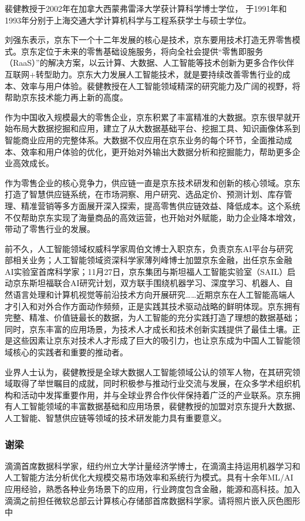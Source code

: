 \documentclass[letterpaper,10pt,english]{sphinxmanual}
\begin{document}
裴健教授于2002年在加拿大西蒙弗雷泽大学获计算科学博士学位，
于1991年和1993年分别于上海交通大学计算机科学与工程系获学士与硕士学位。

刘强东表示，京东下一个十二年发展的核心是技术，京东要用技术打造无界零售模式。京东定位于未来的零售基础设施服务，将向全社会提供“零售即服务（RaaS）”的解决方案，以云计算、大数据、人工智能等技术创新为更多合作伙伴互联网+转型助力。京东大力发展人工智能技术，就是要持续改善零售行业的成本、效率与用户体验。裴健教授在人工智能领域精深的研究能力及广阔的视野，将帮助京东技术能力再上新的高度。

作为中国收入规模最大的零售企业，京东积累了丰富精准的大数据。京东很早就开始布局大数据挖掘和应用，建立了从大数据基础平台、挖掘工具、知识画像体系到智能商业应用的完整体系。大数据不仅应用在京东业务的每个环节，全面推动成本、效率和用户体验的优化，更开始对外输出大数据分析和挖掘能力，帮助更多企业高效成长。

作为零售企业的核心竞争力，供应链一直是京东技术研发和创新的核心领域。京东打造了智慧供应链系统，在市场洞察、用户研究、选品定价、预测计划、库存管理、精准营销等多方面展开深入探索，提高零售供应链效益、降低成本。这个系统不仅帮助京东实现了海量商品的高效运营，也开始对外赋能，助力企业降本增效，带动了零售行业的发展。

前不久，人工智能领域权威科学家周伯文博士入职京东，负责京东AI平台与研究部相关业务；人工智能领域资深科学家薄列峰博士加盟京东金融，出任京东金融AI实验室首席科学家；11月27日，京东集团与斯坦福人工智能实验室（SAIL）启动京东\sphinxhyphen{}斯坦福联合AI研究计划，双方联手围绕机器学习、深度学习、机器人、自然语言处理和计算机视觉等前沿技术方向开展研究……近期京东在人工智能高端人才引入和对外合作方面动作频频，正是实践其技术驱动战略的鲜明体现。京东拥有完整、精准、价值链最长的数据，为人工智能的充分实践打造了理想的数据基础；同时，京东丰富的应用场景，为技术人才成长和技术创新实践提供了最佳土壤。正是这些因素让京东对技术人才形成了巨大的吸引力，也让京东成为中国人工智能领域核心的实践者和重要的推动者。

业界人士认为，裴健教授是全球大数据人工智能领域公认的领军人物，在其研究领域取得了举世瞩目的成就，同时积极参与推动行业交流与发展，在众多学术组织机构和活动中发挥重要作用，并与全球业界合作伙伴保持着广泛的产业联系。京东拥有人工智能领域的丰富数据基础和应用场景，裴健教授的加盟对京东提升大数据、人工智能、智慧供应链等领域的技术研发能力具有重要意义。


\subsubsection{谢梁}
\label{\detokenize{chapter_AI_expert/xie_liang:id1}}\label{\detokenize{chapter_AI_expert/xie_liang::doc}}
滴滴首席数据科学家，纽约州立大学计量经济学博士，在滴滴主持运用机器学习和人工智能方法分析优化大规模交易市场效率和系统行为模式。具有十余年ML/AI应用经验，熟悉各种业务场景下的应用，行业跨度包含金融，能源和高科技。加入滴滴之前担任微软总部云计算核心存储部首席数据科学家。请将照片嵌入灰色图形中
\end{document}
